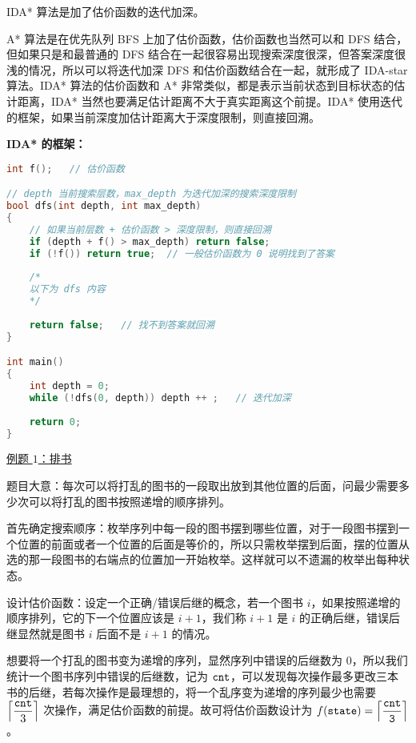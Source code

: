 

IDA* 算法是加了估价函数的迭代加深。

A* 算法是在优先队列 BFS 上加了估价函数，估价函数也当然可以和 DFS 结合，但如果只是和最普通的 DFS 结合在一起很容易出现搜索深度很深，但答案深度很浅的情况，所以可以将迭代加深 DFS 和估价函数结合在一起，就形成了 IDA-star 算法。IDA* 算法的估价函数和 A* 非常类似，都是表示当前状态到目标状态的估计距离，IDA* 当然也要满足估计距离不大于真实距离这个前提。IDA* 使用迭代的框架，如果当前深度加估计距离大于深度限制，则直接回溯。

\textbf{IDA* 的框架：}
\begin{lstlisting}[language=cpp]
int f();   // 估价函数

// depth 当前搜索层数，max_depth 为迭代加深的搜索深度限制
bool dfs(int depth, int max_depth)  
{
    // 如果当前层数 + 估价函数 > 深度限制，则直接回溯
    if (depth + f() > max_depth) return false; 
    if (!f()) return true;  // 一般估价函数为 0 说明找到了答案
    
    /*
    以下为 dfs 内容
    */
    
    return false;   // 找不到答案就回溯
}

int main()
{
    int depth = 0;
    while (!dfs(0, depth)) depth ++ ;   // 迭代加深
    
    return 0;
}
\end{lstlisting}

\href{http://poj.org/problem?id=3460}{例题 $1$：排书}

题目大意：每次可以将打乱的图书的一段取出放到其他位置的后面，问最少需要多少次可以将打乱的图书按照递增的顺序排列。

首先确定搜索顺序：枚举序列中每一段的图书摆到哪些位置，对于一段图书摆到一个位置的前面或者一个位置的后面是等价的，所以只需枚举摆到后面，摆的位置从选的那一段图书的右端点的位置加一开始枚举。这样就可以不遗漏的枚举出每种状态。

设计估价函数：设定一个正确/错误后继的概念，若一个图书 $i$，如果按照递增的顺序排列，它的下一个位置应该是 $i + 1$，我们称 $i + 1$ 是 $i$ 的正确后继，错误后继显然就是图书 $i$ 后面不是 $i + 1$ 的情况。

想要将一个打乱的图书变为递增的序列，显然序列中错误的后继数为 $0$，所以我们统计一个图书序列中错误的后继数，记为 $\tt cnt$，可以发现每次操作最多更改三本书的后继，若每次操作是最理想的，将一个乱序变为递增的序列最少也需要 $\left\lceil\dfrac{\tt cnt}{3}\right\rceil$ 次操作，满足估价函数的前提。故可将估价函数设计为 $f(\tt state) = \left\lceil\dfrac{\tt cnt}{3}\right\rceil$。

